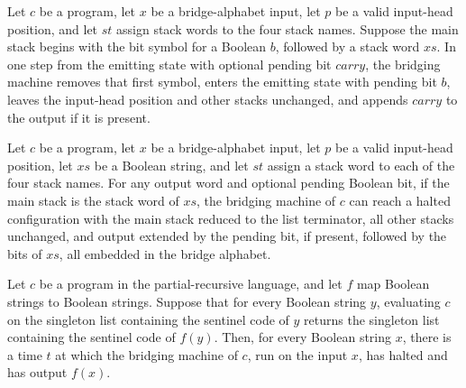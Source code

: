 \begin{lemma}
\label{Turing.bridge_emit_step}
\leanok
{}
Let $c$ be a program, let $x$ be a bridge-alphabet input, let $p$ be a valid input-head
position, and let $st$ assign stack words to the four stack names. Suppose the main
stack begins with the bit symbol for a Boolean $b$, followed by a stack word $xs$. In
one step from the emitting state with optional pending bit $carry$, the bridging machine
removes that first symbol, enters the emitting state with pending bit $b$, leaves the
input-head position and other stacks unchanged, and appends $carry$ to the output if it
is present.
\end{lemma}

\begin{lemma}
\label{Turing.bridge_emit}
\leanok
{}
Let $c$ be a program, let $x$ be a bridge-alphabet input, let $p$ be a valid input-head
position, let $xs$ be a Boolean string, and let $st$ assign a stack word to each of the
four stack names. For any output word and optional pending Boolean bit, if the main
stack is the stack word of $xs$, the bridging machine of $c$ can reach a halted
configuration with the main stack reduced to the list terminator, all other stacks
unchanged, and output extended by the pending bit, if present, followed by the bits of
$xs$, all embedded in the bridge alphabet.
\end{lemma}

\begin{lemma}
\label{Turing.bridge_compiles}
\leanok
{}
Let $c$ be a program in the partial-recursive language, and let $f$ map Boolean strings
to Boolean strings. Suppose that for every Boolean string $y$, evaluating $c$ on the
singleton list containing the sentinel code of $y$ returns the singleton list containing
the sentinel code of $f(y)$. Then, for every Boolean string $x$, there is a time $t$ at
which the bridging machine of $c$, run on the input $x$, has halted and has output
$f(x)$.
\end{lemma}


